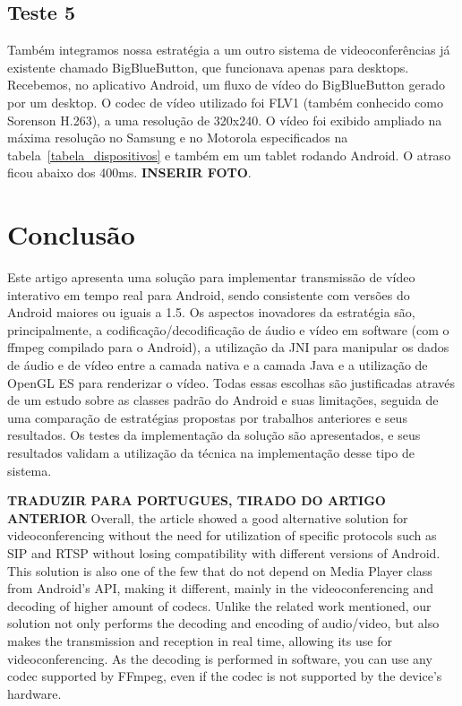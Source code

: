\documentclass{acm_proc_article-sp}
\newcommand{\todo}[1]{\textcolor[rgb]{1.00,0.00,0.00}{\bf \uppercase{#1}}}
\begin{document}
\subsection{Teste 5}
Também integramos nossa estratégia a um outro sistema de videoconferências já existente chamado BigBlueButton, que funcionava apenas para desktops. Recebemos, no aplicativo Android, um fluxo de vídeo do BigBlueButton gerado por um desktop. O codec de vídeo utilizado foi FLV1 (também conhecido como Sorenson H.263), a uma resolução de 320x240. O vídeo foi exibido ampliado na máxima resolução no Samsung e no Motorola especificados na tabela~\ref{tabela_dispositivos} e também em um tablet rodando Android. O atraso ficou abaixo dos 400ms. \todo{inserir foto}.


\section{Conclusão}

Este artigo apresenta uma solução para implementar transmissão de vídeo interativo em tempo real para Android, sendo consistente com versões do Android maiores ou iguais a 1.5. Os aspectos inovadores da estratégia são, principalmente, a codificação/decodificação de áudio e vídeo em software (com o ffmpeg compilado para o Android), a utilização da JNI para manipular os dados de áudio e de vídeo entre a camada nativa e a camada Java e a utilização de OpenGL ES para renderizar o vídeo. Todas essas escolhas são justificadas através de um estudo sobre as classes padrão do Android e suas limitações, seguida de uma comparação de estratégias propostas por trabalhos anteriores e seus resultados. Os testes da implementação da solução são apresentados, e seus resultados validam a utilização da técnica na implementação desse tipo de sistema.

\todo{traduzir para portugues, tirado do artigo anterior} Overall, the article showed a good alternative solution for videoconferencing without the need for utilization of specific protocols such as SIP and RTSP without losing compatibility with different versions of Android. This solution is also one of the few that do not depend on Media Player class from Android’s API, making it different, mainly in the videoconferencing and decoding of higher amount of codecs. Unlike the related work mentioned, our solution not only performs the decoding and encoding of audio/video, but also makes the transmission and reception in real time, allowing its use for videoconferencing. As the decoding is performed in software, you can use any codec supported by FFmpeg, even if the codec is not supported by the device’s hardware.
\end{document}
